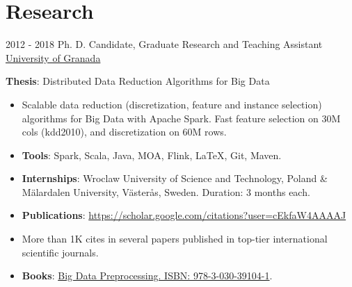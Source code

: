 \documentclass[letterpaper]{twentysecondcv} %
\begin{document}


\section{Research}
\begin{twenty}
	\twentyitem
    	{2012 - 2018}
		{}
        {Ph. D. Candidate, Graduate Research and Teaching Assistant}
        {\href{http://www.ugr.es/}{University of Granada}}
        {}
        {
       	\textbf{Thesis}: Distributed Data Reduction Algorithms for Big Data
        {\begin{itemize}
        \item Scalable data reduction (discretization, feature and instance selection) algorithms for Big Data with Apache Spark. Fast feature selection on 30M cols (kdd2010), and discretization on 60M rows.
        \item \textbf{Tools}: Spark, Scala, Java, MOA, Flink, \LaTeX, Git, Maven.
        \item \textbf{Internships}: Wroclaw University of Science and Technology, Poland \& M\"alardalen University, V\"aster\aa s, Sweden. Duration: 3 months each.        
        \item \textbf{Publications}: \url{https://scholar.google.com/citations?user=cEkfaW4AAAAJ}
        \item More than 1K cites in several papers published in top-tier international scientific journals.
        \item \textbf{Books}: \href{https://link.springer.com/book/10.1007/978-3-030-39105-8}{Big Data Preprocessing. ISBN: 978-3-030-39104-1}. 
		\end{itemize}}
        }
\end{twenty}
\end{document}
